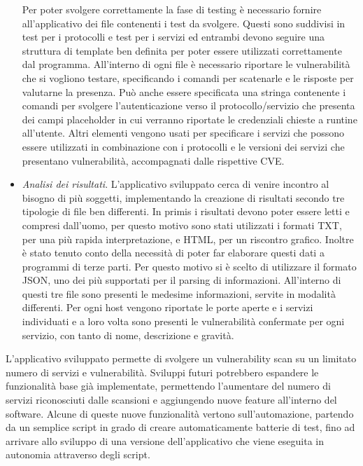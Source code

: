 \documentclass{article}
\begin{document}
\begin{itemize}
    Per poter svolgere correttamente la fase di testing è necessario fornire all'applicativo dei file contenenti i test da svolgere. Questi sono suddivisi in test per i protocolli e test per i servizi ed entrambi devono seguire una struttura di template ben definita per poter essere utilizzati correttamente dal programma. All'interno di ogni file è necessario riportare le vulnerabilità che si vogliono testare, specificando i comandi per scatenarle e le risposte per valutarne la presenza. Può anche essere specificata una stringa contenente i comandi per svolgere l'autenticazione verso il protocollo/servizio che presenta dei campi placeholder in cui verranno riportate le credenziali chieste a runtine all'utente. Altri elementi vengono usati per specificare i servizi che possono essere utilizzati in combinazione con i protocolli e le versioni dei servizi che presentano vulnerabilità, accompagnati dalle rispettive CVE.
    \item \textit{Analisi dei risultati}. L'applicativo sviluppato cerca di venire incontro al bisogno di più soggetti, implementando la creazione di risultati secondo tre tipologie di file ben differenti. In primis i risultati devono poter essere letti e compresi dall'uomo, per questo motivo sono stati utilizzati i formati TXT, per una più rapida interpretazione, e HTML, per un riscontro grafico. Inoltre è stato tenuto conto della necessità di poter far elaborare questi dati a programmi di terze parti. Per questo motivo si è scelto di utilizzare il formato JSON, uno dei più supportati per il parsing di informazioni. All'interno di questi tre file sono presenti le medesime informazioni, servite in modalità differenti. Per ogni host vengono riportate le porte aperte e i servizi individuati e a loro volta sono presenti le vulnerabilità confermate per ogni servizio, con tanto di nome, descrizione e gravità.  
\end{itemize}

L'applicativo sviluppato permette di svolgere un vulnerability scan su un limitato numero di servizi e vulnerabilità. Sviluppi futuri potrebbero espandere le funzionalità base già implementate, permettendo l'aumentare del numero di servizi riconosciuti dalle scansioni e aggiungendo nuove feature all'interno del software. Alcune di queste nuove funzionalità vertono sull'automazione, partendo da un semplice script in grado di creare automaticamente batterie di test, fino ad arrivare allo sviluppo di una versione dell'applicativo che viene eseguita in autonomia attraverso degli script.
\end{document}

